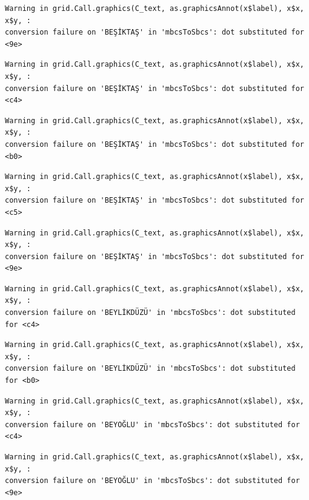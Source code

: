 \documentclass[
  11pt,
  a4paper,
  DIV=11,
  numbers=noendperiod]{scrartcl}
\begin{document}
\begin{verbatim}
Warning in grid.Call.graphics(C_text, as.graphicsAnnot(x$label), x$x, x$y, :
conversion failure on 'BEŞİKTAŞ' in 'mbcsToSbcs': dot substituted for <9e>
\end{verbatim}

\begin{verbatim}
Warning in grid.Call.graphics(C_text, as.graphicsAnnot(x$label), x$x, x$y, :
conversion failure on 'BEŞİKTAŞ' in 'mbcsToSbcs': dot substituted for <c4>
\end{verbatim}

\begin{verbatim}
Warning in grid.Call.graphics(C_text, as.graphicsAnnot(x$label), x$x, x$y, :
conversion failure on 'BEŞİKTAŞ' in 'mbcsToSbcs': dot substituted for <b0>
\end{verbatim}

\begin{verbatim}
Warning in grid.Call.graphics(C_text, as.graphicsAnnot(x$label), x$x, x$y, :
conversion failure on 'BEŞİKTAŞ' in 'mbcsToSbcs': dot substituted for <c5>
\end{verbatim}

\begin{verbatim}
Warning in grid.Call.graphics(C_text, as.graphicsAnnot(x$label), x$x, x$y, :
conversion failure on 'BEŞİKTAŞ' in 'mbcsToSbcs': dot substituted for <9e>
\end{verbatim}

\begin{verbatim}
Warning in grid.Call.graphics(C_text, as.graphicsAnnot(x$label), x$x, x$y, :
conversion failure on 'BEYLİKDÜZÜ' in 'mbcsToSbcs': dot substituted for <c4>
\end{verbatim}

\begin{verbatim}
Warning in grid.Call.graphics(C_text, as.graphicsAnnot(x$label), x$x, x$y, :
conversion failure on 'BEYLİKDÜZÜ' in 'mbcsToSbcs': dot substituted for <b0>
\end{verbatim}

\begin{verbatim}
Warning in grid.Call.graphics(C_text, as.graphicsAnnot(x$label), x$x, x$y, :
conversion failure on 'BEYOĞLU' in 'mbcsToSbcs': dot substituted for <c4>
\end{verbatim}

\begin{verbatim}
Warning in grid.Call.graphics(C_text, as.graphicsAnnot(x$label), x$x, x$y, :
conversion failure on 'BEYOĞLU' in 'mbcsToSbcs': dot substituted for <9e>
\end{verbatim}
\end{document}
